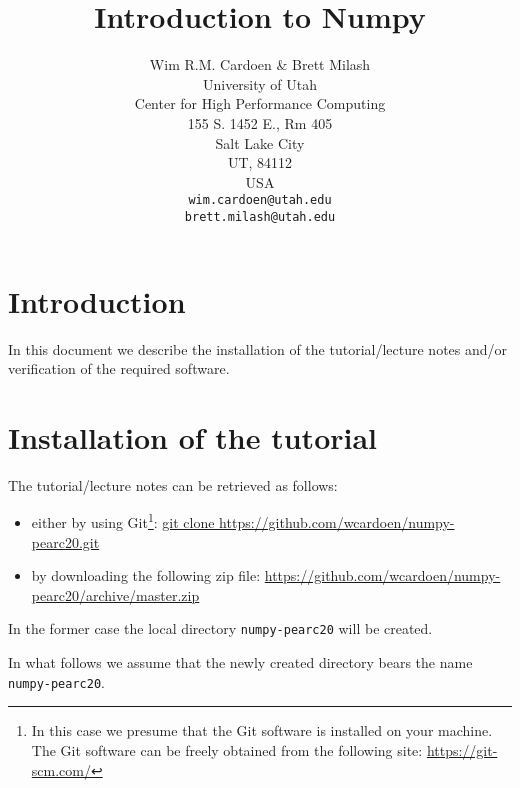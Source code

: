 \documentclass[11pt]{article}
\begin{document}
\title{Introduction to Numpy}
\author{Wim R.M. Cardoen \& Brett Milash\\
        University of Utah\\
        Center for High Performance Computing\\
        155 S. 1452 E., Rm 405\\
        Salt Lake City\\
        UT, 84112\\
        USA\\
        \texttt{wim.cardoen@utah.edu}\\
	\texttt{brett.milash@utah.edu}}
\renewcommand{\today}{July 21, 2020}
\renewcommand{\labelitemii}{$\star$}
\maketitle

\section*{Introduction}
In this document we describe the installation of the tutorial/lecture notes 
and/or verification of the required software.

\renewcommand \thesection{\Roman{section}}
\section{Installation of the tutorial}
The tutorial/lecture notes can be retrieved as follows:
\begin{itemize}
\item either by using Git\footnote{In this case we presume that the Git software is installed on your machine. 
	The Git software can be freely obtained from the following site: \href{https://git-scm.com/}{https://git-scm.com/}}:\newline
		\href{git clone https://github.com/wcardoen/numpy-pearc20.git}{git clone https://github.com/wcardoen/numpy-pearc20.git}
\item by downloading the following zip file:\newline
	\href{https://github.com/wcardoen/numpy-pearc20/archive/master.zip}{https://github.com/wcardoen/numpy-pearc20/archive/master.zip}
\end{itemize}
In the former case the local directory \texttt{numpy-pearc20} 
will be created. 

In what follows we assume that the newly created directory bears the name \texttt{numpy-pearc20}.  
\end{document}
